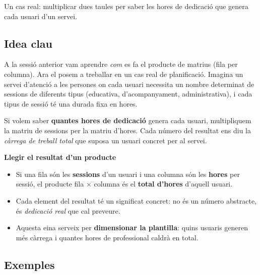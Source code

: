 %
{Un cas real: multiplicar dues taules per saber les hores de dedicació que genera cada usuari d'un servei.}

\subsection{Idea clau}

A la sessió anterior vam aprendre \emph{com} es fa el producte de matrius (fila
per columna). Ara el posem a treballar en un cas real de planificació. Imagina un
servei d'atenció a les persones on cada usuari necessita un nombre determinat de
sessions de diferents tipus (educativa, d'acompanyament, administrativa), i cada
tipus de sessió té una durada fixa en hores.

Si volem saber \textbf{quantes hores de dedicació} genera cada usuari, multipliquem
la matriu de sessions per la matriu d'hores. Cada número del resultat ens diu la
\emph{càrrega de treball total} que suposa un usuari concret per al servei.

\begin{idea}
\textbf{Llegir el resultat d'un producte}
\begin{itemize}[leftmargin=1.4em, itemsep=2pt]
  \item Si una fila són les \textbf{sessions} d'un usuari i una columna són les
        \textbf{hores} per sessió, el producte fila $\times$ columna és el
        \textbf{total d'hores} d'aquell usuari.
  \item Cada element del resultat té un significat concret: no és un número
        abstracte, és \emph{dedicació real} que cal preveure.
  \item Aquesta eina serveix per \textbf{dimensionar la plantilla}: quins usuaris
        generen més càrrega i quantes hores de professional caldrà en total.
\end{itemize}
\end{idea}

\subsection{Exemples}

